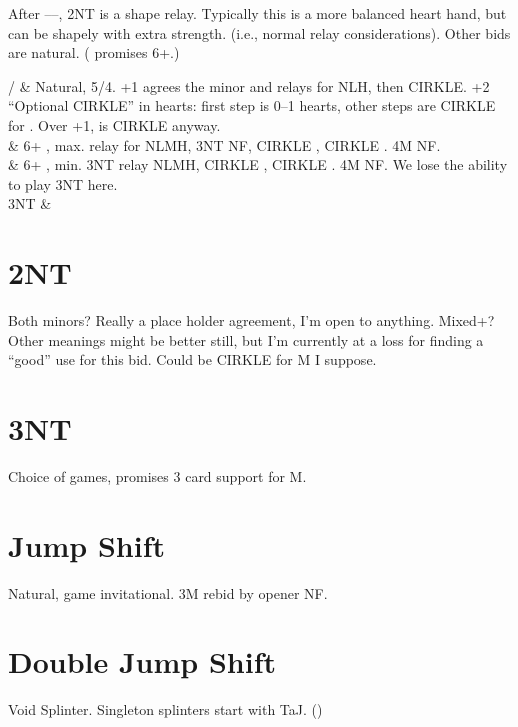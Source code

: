 \documentclass[tom-ari]{subfile}
\begin{document}
	After ----, 2NT is a shape relay. Typically this is a more balanced heart hand, but can be shapely with extra strength. (i.e., normal relay considerations). Other bids are natural. ( promises 6+.)
	
	\begin{bidtable}{}
		/ & Natural, 5/4. +1 agrees the minor and relays for NLH, then CIRKLE. +2 ``Optional CIRKLE'' in hearts: first step is 0--1 hearts, other steps are CIRKLE for \heartsuit. Over +1,  is CIRKLE anyway. \\
		 & 6+ \spadesuit, max.  relay for NLMH, 3NT NF,  CIRKLE \heartsuit,  CIRKLE \spadesuit. 4M NF. \\
		 & 6+ \spadesuit, min. 3NT relay NLMH,  CIRKLE \heartsuit,  CIRKLE \spadesuit. 4M NF. We lose the ability to play 3NT here. \\
		3NT &  \\
	\end{bidtable}
		
	
	\section{2NT}
	
	Both minors?  Really a place holder agreement, I'm open to anything. Mixed+? Other meanings might be better still, but I'm currently at a loss for finding a ``good'' use for this bid. Could be CIRKLE for M I suppose.
	
	\section{3NT}
	
	Choice of games, promises 3 card support for M.
	
	\section{Jump Shift}
	
	Natural, game invitational. 3M rebid by opener NF.
	
	\section{Double Jump Shift}
	
	Void Splinter. Singleton splinters start with TaJ. ()
		
\end{document}
